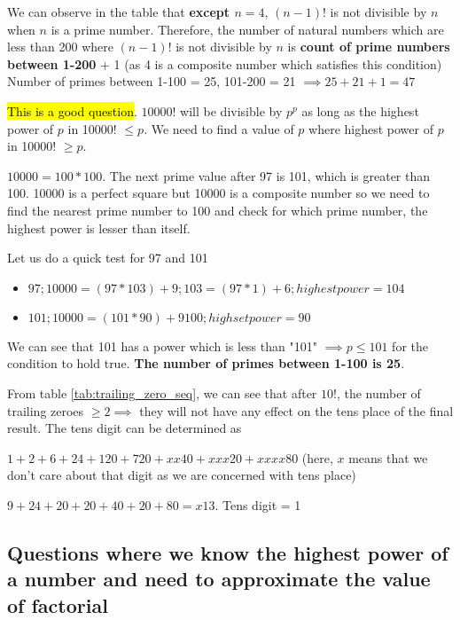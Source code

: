 We can observe in the table that \textbf{except $n=4$}, $(n-1)!$ is not divisible by $n$ when $n$ is a prime number. Therefore, the number of natural numbers which are less than 200 where $(n-1)!$ is not divisible by $n$ is \textbf{count of prime numbers between 1-200} + 1 (as 4 is a composite number which satisfies this condition) \\

Number of primes between 1-100 = 25, 101-200 = 21 $\implies 25 + 21 + 1 = 47$


\hl{This is a good question}. $10000!$ will be divisible by $p^p$ as long as the highest power of $p$ in 10000! $\leq p$. We need to find a value of $p$ where highest power of $p$ in 10000! $\ge p$.  

$10000 = 100 * 100$. The next prime value after 97 is 101, which is greater than 100. 10000 is a perfect square but 10000 is a composite number so we need to find the nearest prime number to 100 and check for which prime number, the highest power is lesser than itself. 

Let us do a quick test for 97 and 101
\begin{itemize}
    \item $97; 10000 = (97 * 103) + 9 ; 103 = (97 * 1) + 6; highest power = 104$
    \item $101; 10000 = (101 * 90) + 9100 ; highset power = 90$
\end{itemize}

We can see that 101 has a power which is less than "101" $\implies p \le 101$ for the condition to hold true. \textbf{The number of primes between 1-100 is 25}.


From table \ref{tab:trailing_zero_seq}, we can see that after $10!$, the number of trailing zeroes $\geq 2 \implies$ they will not have any effect on the tens place of the final result. The tens digit can be determined as 

$1 + 2 + 6 + 24 + 120 + 720 + xx40 + xxx20 + xxxx80$ (here, $x$ means that we don't care about that digit as we are concerned with tens place)

$9 + 24 + 20 + 20 + 40 + 20 + 80 = x13$. Tens digit = 1

\subsection{Questions where we know the highest power of a number and need to approximate the value of factorial}

